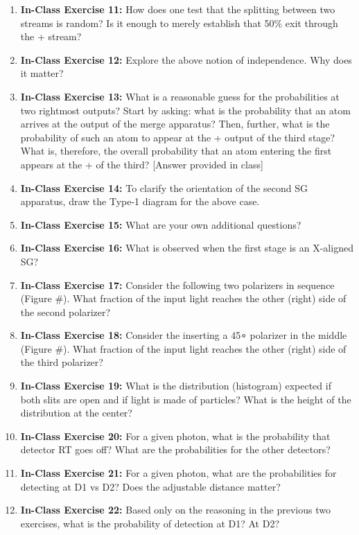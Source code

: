 \documentclass[main.tex]{subfiles}
\begin{document}
\begin{enumerate}
\item[] \textbf{In-Class Exercise 11:} How does one test that the splitting between two streams is random? Is it enough to merely establish that 50\% exit through the + stream?

\item[] \textbf{In-Class Exercise 12:} Explore the above notion of independence. Why does it matter?

\item[] \textbf{In-Class Exercise 13:} What is a reasonable guess for the probabilities at two rightmost outputs? Start by asking: what is the probability that an atom arrives at the output of the merge apparatus? Then, further, what is the probability of such an atom to appear at the + output of the third stage? What is, therefore, the overall probability that an atom entering the first appears at the + of the third?
[Answer provided in class]

\item[] \textbf{In-Class Exercise 14:} To clarify the orientation of the second SG apparatus, draw the Type-1 diagram for the above case.

\item[] \textbf{In-Class Exercise 15:} What are your own additional questions?

\item[] \textbf{In-Class Exercise 16:} What is observed when the first stage is an X-aligned SG?

\item[] \textbf{In-Class Exercise 17:} Consider the following two polarizers in sequence (Figure #). What fraction of the input light reaches the other (right) side of the second polarizer?

\item[] \textbf{In-Class Exercise 18:} Consider the inserting a 45∘ polarizer in the middle (Figure #). What fraction of the input light reaches the other (right) side of the third polarizer?

\item[] \textbf{In-Class Exercise 19:} What is the distribution (histogram) expected if both slits are open and if light is made of particles? What is the height of the distribution at the center?

\item[] \textbf{In-Class Exercise 20:} For a given photon, what is the probability that detector RT goes off? What are the probabilities for the other detectors?

\item[] \textbf{In-Class Exercise 21:} For a given photon, what are the probabilities for detecting at D1 vs D2? Does the adjustable distance matter?

\item[] \textbf{In-Class Exercise 22:} Based only on the reasoning in the previous two exercises, what is the probability of detection at D1? At D2?

\end{enumerate}
\end{document}
